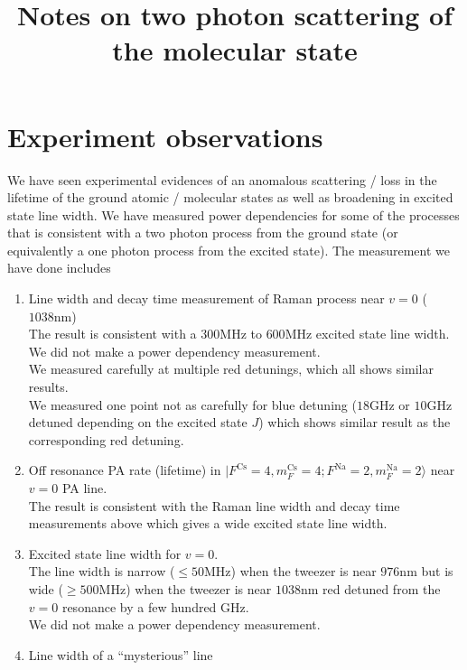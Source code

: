 \documentclass[10pt,fleqn]{article}
\title{Notes on two photon scattering of the molecular state}
\begin{document}
\maketitle

\section{Experiment observations}
We have seen experimental evidences of an anomalous scattering / loss in the
lifetime of the ground atomic / molecular states as well as broadening in excited state
line width. We have measured power dependencies for some of the processes that is
consistent with a two photon process from the ground state (or equivalently a one
photon process from the excited state). The measurement we have done includes

\begin{enumerate}
\item Line width and decay time measurement of Raman process near $v=0$ ($1038 \mathrm{nm}$)\\
  The result is consistent with a $300 \mathrm{MHz}$ to $600 \mathrm{MHz}$
  excited state line width.\\
  We did not make a power dependency measurement.\\
  We measured carefully at multiple red detunings, which all shows similar results.\\
  We measured one point not as carefully for blue detuning
  ($18 \mathrm{GHz}$ or $10 \mathrm{GHz}$ detuned depending on the excited state $J$)
  which shows similar result as the corresponding red detuning.
\item Off resonance PA rate (lifetime) in $|F^{\mathrm{Cs}}\!=\!4, m_{F}^{\mathrm{Cs}}\!=\!4; F^{\mathrm{Na}}\!=\!2, m_{F}^{\mathrm{Na}}\!=\!2\rangle$
  near $v=0$ PA line.\\
  The result is consistent with the Raman line width and decay time measurements above
  which gives a wide excited state line width.
\item Excited state line width for $v=0$.\\
  The line width is narrow ($\leqslant 50 \mathrm{MHz}$)
  when the tweezer is near $976 \mathrm{nm}$ but is wide ($\geqslant 500 \textrm{MHz}$)
  when the tweezer is near $1038 \mathrm{nm}$ red detuned from the $v=0$ resonance
  by a few hundred GHz.\\
  We did not make a power dependency measurement.
\item Line width of a ``mysterious'' line\\

\end{enumerate}
\end{document}
